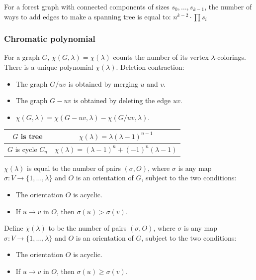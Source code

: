 For a forest graph with connected components of sizes $s_0, \dots, s_{k - 1}$, 
the number of ways to add edges to make a spanning tree is equal to:
$ n^{k - 2} \cdot \prod s_i$

\subsubsection*{Chromatic polynomial}
For a graph $G$, $\chi(G, \lambda) = \chi(\lambda)$ counts the number of its vertex $\lambda$-colorings.
There is a unique polynomial $\chi(\lambda)$. Deletion-contraction:
\begin{itemize}
\item The graph $G/uv$ is obtained by merging $u$ and $v$.
\item The graph $G - uv$ is obtained by deleting the edge $uv$.
\item $\chi(G, \lambda) = \chi(G - uv, \lambda) - \chi(G/uv, \lambda)$. 
\end{itemize}

\begin{tabular}{|c|c|}
\hline
$G$ is tree & $\chi(\lambda) = \lambda(\lambda - 1)^{n - 1}$ \\
\hline
$G$ is cycle $C_n$ & $\chi(\lambda) = (\lambda - 1)^n + (-1)^n(\lambda - 1)$\\
\hline
\end{tabular} 
 
\begin{proposition}
    $\chi(\lambda)$ is equal to the number of pairs $(\sigma, O)$, 
    where $\sigma$ is any map $\sigma : V \rightarrow \{1, \dots, \lambda\}$ and $O$ is an orientation of $G$, 
    subject to the two conditions:
    \begin{itemize}
        \item The orientation $O$ is acyclic.
        \item If $u \rightarrow v$ in $O$, then $\sigma (u) > \sigma (v)$.
    \end{itemize}
\end{proposition}

Define $\overline{\chi}(\lambda)$ to be the number of pairs $(\sigma, O)$, 
where $\sigma$ is any map $\sigma : V \rightarrow \{1, \dots, \lambda\}$ and $O$ is an orientation of $G$, 
subject to the two conditions:
\begin{itemize}
\item The orientation $O$ is acyclic.
\item If $u \rightarrow v$ in $O$, then $\sigma (u) \ge \sigma (v)$.
\end{itemize}

